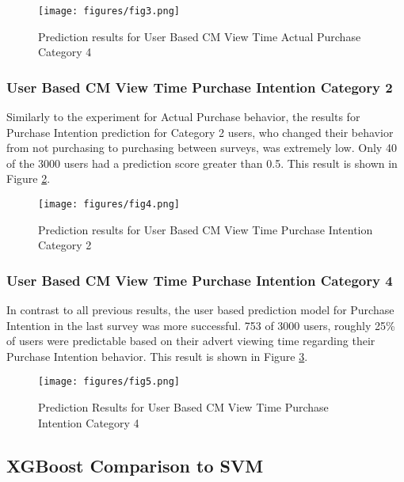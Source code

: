 \documentclass[review]{elsarticle}
\begin{document}
\begin{figure}
\centering
\texttt{[image: figures/fig3.png]}
\caption{Prediction results for User Based CM View Time \textperiodcentered  Actual Purchase Category 4}
\label{fig:3}
\end{figure}

\subsubsection{User Based CM View Time \textperiodcentered  Purchase Intention Category 2}
\label{user_pi_2}

Similarly to the experiment for Actual Purchase behavior, the results for Purchase Intention prediction for Category 2 users, who changed their behavior from not purchasing to purchasing between surveys, was extremely low. Only 40 of the 3000 users had a prediction score greater than 0.5. This result is shown in Figure \ref{fig:4}. 

\begin{figure}
\centering
\texttt{[image: figures/fig4.png]}
\caption{Prediction results for User Based CM View Time \textperiodcentered  Purchase Intention Category 2}
\label{fig:4}
\end{figure}

\subsubsection{User Based CM View Time \textperiodcentered  Purchase Intention Category 4}
\label{user_pi_4}

In contrast to all previous results, the user based prediction model for Purchase Intention in the last survey was more successful. 753 of 3000 users, roughly 25\% of users were predictable based on their advert viewing time regarding their Purchase Intention behavior. This result is shown in Figure \ref{fig:5}.

\begin{figure}
\centering
\texttt{[image: figures/fig5.png]}
\caption{Prediction Results for User Based CM View Time \textperiodcentered  Purchase Intention Category 4}
\label{fig:5}
\end{figure}

\subsection{XGBoost Comparison to SVM}
\label{svmxgboost}
\end{document}
